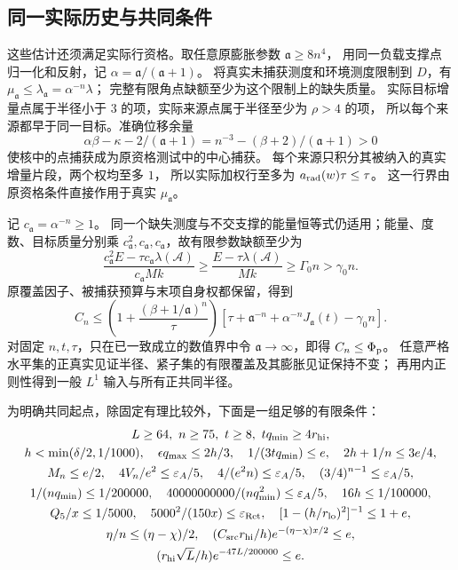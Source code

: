 \documentclass[UTF8,a4paper,11pt,fontset=fandol]{ctexart}
\theoremstyle{remark}
\begin{document}
\subsection{同一实际历史与共同条件}\label{subsec:relative-finish}
这些估计还须满足实际行资格。取任意原膨胀参数 $\mathfrak a\ge8n^4$，
用同一负载支撑点归一化和反射，记 $\alpha=\mathfrak a/(\mathfrak a+1)$。
将真实未捕获测度和环境测度限制到 $D$，有 $\mu_{\mathfrak a}\le\lambda_{\mathfrak a}=\alpha^{-n}\lambda$；
完整有限角点缺额至少为这个限制上的缺失质量。
实际目标增量点属于半径小于 $3$ 的项，实际来源点属于半径至少为 $\rho>4$ 的项，
所以每个来源都早于同一目标。准确位移余量
\[
 \alpha\beta-\kappa-2/(\mathfrak a+1)
 =n^{-3}-(\beta+2)/(\mathfrak a+1)>0
\]
使核中的点捕获成为原资格测试中的中心捕获。
每个来源只积分其被纳入的真实增量片段，两个权均至多 $1$，
所以实际加权行至多为 $a_{\rm rad}(w)\tau\le\tau$。
这一行界由原资格条件直接作用于真实 $\mu_{\mathfrak a}$。

记 $c_{\mathfrak a}=\alpha^{-n}\ge1$。
同一个缺失测度与不交支撑的能量恒等式仍适用；能量、度数、目标质量分别乘
$c_{\mathfrak a}^2,c_{\mathfrak a},c_{\mathfrak a}$，故有限参数缺额至少为
\[
 \frac{c_{\mathfrak a}^2E-\tau c_{\mathfrak a}\lambda(\mathcal A)}{c_{\mathfrak a}Mk}
 \ge\frac{E-\tau\lambda(\mathcal A)}{Mk}\ge\Gamma_0n>\gamma_0n.
\]
原覆盖因子、被捕获预算与末项自身权都保留，得到
\[
 C_n\le\left(1+\frac{(\beta+1/\mathfrak a)^n}{\tau}\right)
 [\tau+\mathfrak a^{-n}+\alpha^{-n}J_{\mathfrak a}(t)-\gamma_0n].
\]
对固定 $n,t,\tau$，只在已一致成立的数值界中令 $\mathfrak a\to\infty$，即得 $C_n\le\Phi_{\rm p}$。
任意严格水平集的正真实见证半径、紧子集的有限覆盖及其膨胀见证保持不变；
再用内正则性得到一般 $L^1$ 输入与所有正共同半径。

为明确共同起点，除固定有理比较外，下面是一组足够的有限条件：
\begin{equation}\label{eq:profile-eventual-guards}
\begin{gathered}
 L\ge64,\ n\ge75,\ t\ge8,\ tq_{\min}\ge4r_{\rm hi},\\
 h<\min(\delta/2,1/1000),\quad\epsilon q_{\max}\le2h/3,\quad
 1/(3tq_{\min})\le e,\quad2h+1/n\le3e/4,\\
 M_n\le e/2,\quad4V_n/e^2\le\varepsilon_A/5,\quad
 4/(e^2n)\le\varepsilon_A/5,\quad(3/4)^{n-1}\le\varepsilon_A/5,\\
 1/(nq_{\min})\le1/200000,\quad
 40000000000/(nq_{\min}^2)\le\varepsilon_A/5,\quad16h\le1/100000,\\
 Q_5/x\le1/5000,\quad5000^2/(150x)\le\varepsilon_{\rm Ret},\quad
 [1-(h/r_{\rm lo})^2]^{-1}\le1+e,\\
 \eta/n\le(\eta-\chi)/2,\quad
 (C_{\rm src}r_{\rm hi}/h)e^{-(\eta-\chi)x/2}\le e,\\
 (r_{\rm hi}\sqrt L/h)e^{-47L/200000}\le e.
\end{gathered}
\end{equation}
\end{document}
